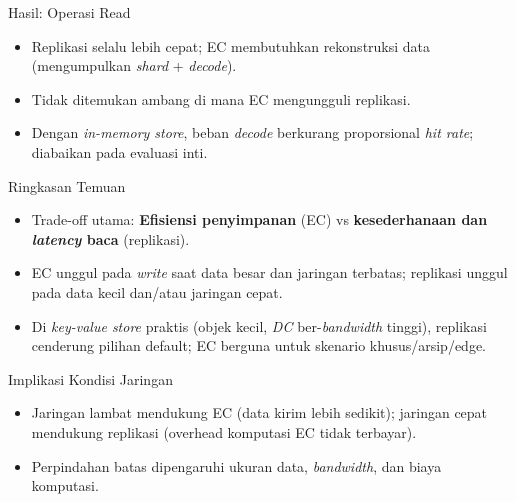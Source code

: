 \documentclass[a2,portrait]{config/poster/a0poster}
\newcommand{\postersection}[1]{%
	\begin{tcolorbox}[
		colback=MainBlue,
		colframe=MainBlue,
		fonttitle=\bfseries,
		coltext=white,
		sharp corners,
		boxrule=0pt,
		top=0pt,
		bottom=0pt,
		halign=center
	]
	\normalsize #1
	\end{tcolorbox}%
}
\begin{document}
\begin{multicols}{2}

\postersection{Hasil: Operasi Read}
\begin{itemize}
	\item Replikasi selalu lebih cepat; EC membutuhkan rekonstruksi data (mengumpulkan \textit{shard} + \textit{decode}).
	\item Tidak ditemukan ambang di mana EC mengungguli replikasi.
	\item Dengan \textit{in-memory store}, beban \textit{decode} berkurang proporsional \textit{hit rate}; diabaikan pada evaluasi inti.
\end{itemize}


\postersection{Ringkasan Temuan}
\begin{itemize}
	\item Trade-off utama: \textbf{Efisiensi penyimpanan} (EC) vs \textbf{kesederhanaan dan \textit{latency} baca} (replikasi).
	\item EC unggul pada \textit{write} saat data besar dan jaringan terbatas; replikasi unggul pada data kecil dan/atau jaringan cepat.
	\item Di \textit{key-value store} praktis (objek kecil, \textit{DC} ber-\textit{bandwidth} tinggi), replikasi cenderung pilihan default; EC berguna untuk skenario khusus/arsip/edge.
\end{itemize}


\postersection{Implikasi Kondisi Jaringan}
\begin{itemize}
	\item Jaringan lambat mendukung EC (data kirim lebih sedikit); jaringan cepat mendukung replikasi (overhead komputasi EC tidak terbayar).
	\item Perpindahan batas dipengaruhi ukuran data, \textit{bandwidth}, dan biaya komputasi.
\end{itemize}



\end{multicols}
\end{document}
